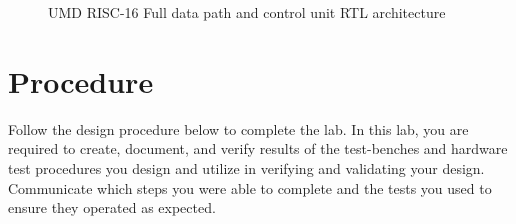 \documentclass{article}
\begin{document}
\begin{figure}[!htbp]
  \centering
  \caption{UMD RISC-16 Full data path and control unit RTL architecture}
  \label{fig:UMDRISCLayout}
\end{figure}
\FloatBarrier

\section{Procedure}

Follow the design procedure below to complete the lab. In this lab, you are required to create, document, and verify results of the test-benches and hardware test procedures you design and utilize in verifying and validating your design. Communicate which steps you were able to complete and the tests you used to ensure they operated as expected.
\end{document}
